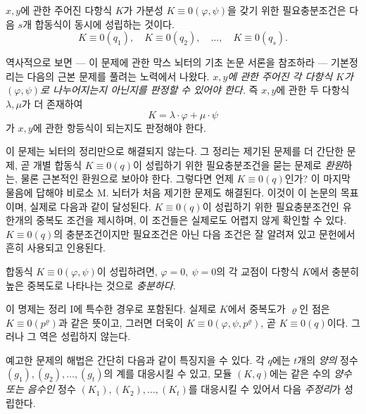 \(x,y\)에 관한 주어진 다항식 \(K\)가 가분성 \(K\equiv0(\varphi,\psi)\)을 갖기 위한 필요충분조건은 다음 \(s\)개 합동식이 동시에 성립하는 것이다.
\[
K\equiv0(q_1),\quad K\equiv0(q_2),\quad\ldots,\quad K\equiv0(q_s).
\]

역사적으로 보면 --- 이 문제에 관한 막스 뇌터의 기초 논문 서론을 참조하라 --- 기본정리는 다음의 근본 문제를 풀려는 노력에서 나왔다. \emph{\(x,y\)에 관한 주어진 각 다항식 \(K\)가 \((\varphi,\psi)\)로 나누어지는지 아닌지를 판정할 수 있어야 한다.} 즉 \(x,y\)에 관한 두 다항식 \(\lambda,\mu\)가 더 존재하여
\[
K=\lambda\cdot\varphi+\mu\cdot\psi
\]
가 \(x,y\)에 관한 항등식이 되는지도 판정해야 한다.

이 문제는 뇌터의 정리만으로 해결되지 않는다. 그 정리는 제기된 문제를 더 간단한 문제, 곧 개별 합동식 \(K\equiv0(q)\)이 성립하기 위한 필요충분조건을 묻는 문제로 \emph{환원}하는, 물론 근본적인 환원으로 보아야 한다. 그렇다면 언제 \(K\equiv0(q)\)인가? 이 마지막 물음에 답해야 비로소 M. 뇌터가 처음 제기한 문제도 해결된다. 이것이 이 논문의 목표이며, 실제로 다음과 같이 달성된다. \(K\equiv0(q)\)이 성립하기 위한 필요충분조건인 유한개의 중복도 조건을 제시하며, 이 조건들은 실제로도 어렵지 않게 확인할 수 있다. \(K\equiv0(q)\)의 충분조건이지만 필요조건은 아닌 다음 조건은 잘 알려져 있고 문헌에서 흔히 사용되고 인용된다.

합동식 \(K\equiv0(\varphi,\psi)\)이 성립하려면, \(\varphi=0,\ \psi=0\)의 각 교점이 다항식 \(K\)에서 \glqq{}충분히\grqq{} 높은 중복도로 나타나는 것으로 \emph{충분하다}.

이 명제는 정리 I에 특수한 경우로 포함된다. 실제로 \(K\)에서 중복도가 \(\varrho\)인 점은 \(K\equiv0(p^\varrho)\)과 같은 뜻이고, 그러면 더욱이 \(K\equiv0(\varphi,\psi,p^\varrho)\), 곧 \(K\equiv0(q)\)이다. 그러나 그 역은 성립하지 않는다.

예고한 문제의 해법은 간단히 다음과 같이 특징지을 수 있다. 각 \(q\)에는 \(t\)개의 \emph{양의} 정수 \((g_1),(g_2),\ldots,(g_t)\)의 계를 대응시킬 수 있고, 모듈 \((K,q)\)에는 같은 수의 \emph{양수 또는 음수인} 정수 \((K_1),(K_2),\ldots,(K_t)\)를 대응시킬 수 있어서 다음 \emph{주정리}가 성립한다.

